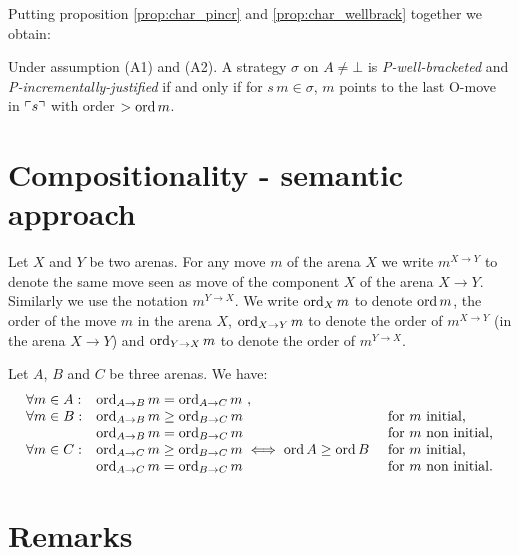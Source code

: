 Putting proposition \ref{prop:char_pincr} and
\ref{prop:char_wellbrack} together we obtain:
\begin{proposition}
Under assumption (A1) and (A2).
A strategy $\sigma$ on $A\neq \bot$
is \emph{P-well-bracketed} and
 \emph{P-incrementally-justified} if and only if
for $s \, m \in \sigma$, $m$ points to the last O-move in $\ulcorner s \urcorner$ with order $>\mathop{\mathrm{ord}}{m}$.
\end{proposition}

\section{Compositionality - semantic approach}
 

Let $X$ and $Y$ be two arenas.
For any move $m$ of the arena $X$ we write $m^{X\rightarrow Y}$ to denote the same move seen as move of the component $X$ of the arena $X\rightarrow Y$.
Similarly we use the notation $m^{Y\rightarrow X}$.
We write $\mathop{\mathrm{ord}}_X{m}$ to denote $\mathop{\mathrm{ord}}{m}$, the order of the move $m$ in the arena $X$, $\mathop{\mathrm{ord}}_{X\rightarrow Y}{m}$ to denote the order of $m^{X\rightarrow Y}$ (in the arena $X\rightarrow Y$) and $\mathop{\mathrm{ord}}_{Y\rightarrow X}{m}$ to denote the order of $m^{Y\rightarrow X}$.

\begin{lemma}
Let $A$, $B$ and $C$ be three arenas. We have:
$$\begin{array}{lll}
\forall m \in A:
    &  \mathop{\mathrm{ord}}_{A\rightarrow B}{m} = \mathop{\mathrm{ord}}_{A\rightarrow C}{m} \ ,\\
\forall m \in B:
    & \mathop{\mathrm{ord}}_{A\rightarrow B}{m} \geq \mathop{\mathrm{ord}}_{B\rightarrow C}{m}  & \mbox{for $m$ initial,}\\
    & \mathop{\mathrm{ord}}_{A\rightarrow B}{m} = \mathop{\mathrm{ord}}_{B\rightarrow C}{m} & \mbox{for $m$ non initial,} \\
\forall m \in C:
    & \mathop{\mathrm{ord}}_{A\rightarrow C}{m} \geq \mathop{\mathrm{ord}}_{B\rightarrow C}{m} \iff
\mathop{\mathrm{ord}}{A} \geq \mathop{\mathrm{ord}}{B}\ & \mbox{for $m$ initial,}\\
    & \mathop{\mathrm{ord}}_{A\rightarrow C}{m} = \mathop{\mathrm{ord}}_{B\rightarrow C}{m}   & \mbox{for $m$ non initial.}
\end{array}
$$
\end{lemma}




\section{Remarks}
